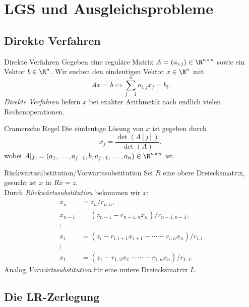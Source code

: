 \section*{LGS und Ausgleichsprobleme}

\subsection*{Direkte Verfahren}

\begin{karte}{Direkte Verfahren}
    Gegeben eine reguläre Matrix \( A = (a_{i,j}) \in \R^{n\times n} \) sowie ein Vektor 
    \( b \in \R^n \). Wir suchen den eindeutigen Vektor \(x \in \R^n\) mit 
    \[ Ax = b \Leftrightarrow \sum_{j=1}^n a_{i,j} x_j = b_i. \]
    \textit{Direkte Verfahren} liefern \(x \) bei exakter Arithmetik nach 
    endlich vielen Rechenoperationen.
\end{karte}

\begin{karte}{Cramersche Regel}
    Die eindeutige Lösung von \( x \) ist gegeben durch 
    \[ x_j = \frac{ \det(A[j]) }{ \det(A) }, \]
    wobei \( A[j] = (a_1, \ldots, a_{j-1}, b, a_{j+1}, \ldots, a_n) \in \R^{n\times n} \) ist.
\end{karte}

\begin{karte}{Rückwärtssubstitution/Vorwärtssubstitution}
    Sei \( R \) eine obere Dreiecksmatrix, gesucht ist \(x\) in \( Rx = z \).\\
    Durch \textit{Rückwärtssubstitution} bekommen wir \(x\):
    \begin{align*}
        x_n &= z_n / r_{n,n}, \\
        x_{n-1} &= (z_{n-1} - r_{n-1,n} x_n) / r_{n-1,n-1}, \\
        \vdots \\
        x_i &= (z_i - r_{i,i+1} x_{i+1} - \cdots - r_{i,n} x_n) / r_{i,i} \\
        \vdots \\
        x_1 &= (z_1 - r_{1,2}x_2 - \cdots - r_{1,n}x_n) / r_{1,1}.
    \end{align*}
    Analog \textit{Vorwärtssubstitution} für eine untere Dreiecksmatrix \(L\).
\end{karte}

\subsection*{Die LR-Zerlegung}


